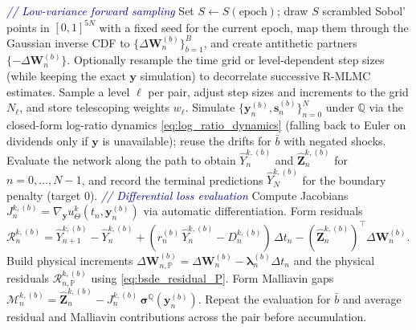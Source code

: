\documentclass[11pt,letterpaper,oneside]{article}
\numberwithin{equation}{section}
\newcommand{\1}{\mathbf{1}}
\begin{document}
\begin{algorithm}[H]
\begin{algorithmic}[1]
    \State \textcolor{darkblue}{\textit{// Low-variance forward sampling}}
    \State Set $S \leftarrow S(\mathrm{epoch})$; draw $S$ scrambled Sobol' points in $[0,1]^{5N}$ with a fixed seed for the current epoch, map them through the Gaussian inverse CDF to $\{\Delta\bm{W}_{n}^{(b)}\}_{b=1}^{B}$, and create antithetic partners $\{-\Delta\bm{W}_{n}^{(b)}\}$.
    \State Optionally resample the time grid or level-dependent step sizes (while keeping the exact $\bm{y}$ simulation) to decorrelate successive R-MLMC estimates.
      \State Sample a level $\ell$ per pair, adjust step sizes and increments to the grid $N_\ell$, and store telescoping weights $w_\ell$.
    \EndIf
      \State Simulate $\{\bm{y}_{n}^{(b)},\bm{s}_{n}^{(b)}\}_{n=0}^{N}$ under $\mathbb{Q}$ via the closed-form log-ratio dynamics \cref{eq:log_ratio_dynamics} (falling back to Euler on dividends only if $\bm{y}$ is unavailable); reuse the drifts for $\bar{b}$ with negated shocks.
      \State Evaluate the network along the path to obtain $\widehat{Y}_{n}^{k,(b)}$ and $\widehat{\bm{Z}}_{n}^{k,(b)}$ for $n=0,\dots,N-1$, and record the terminal predictions $\widehat{Y}_{N}^{k,(b)}$ for the boundary penalty (target $0$).
      \State \textcolor{darkblue}{\textit{// Differential loss evaluation}}
        \State Compute Jacobians $J_{n}^{k,(b)} = \nabla_{\bm{y}} u_{\Theta}^{k}(t_n,\bm{y}_{n}^{(b)})$ via automatic differentiation.
        \State Form residuals $\mathcal{R}_{n}^{k,(b)} = \widehat{Y}_{n+1}^{k,(b)} - \widehat{Y}_{n}^{k,(b)} + (r_{n}^{(b)}\,\widehat{Y}_{n}^{k,(b)} - D_{n}^{k,(b)})\,\Delta t_n - (\widehat{\bm{Z}}_{n}^{k,(b)})^{\top}\Delta\bm{W}_{n}^{(b)}$.
        \State Build physical increments $\Delta\bm{W}_{n,\mathbb{P}}^{(b)} = \Delta\bm{W}_{n}^{(b)} - \bm{\lambda}_{n}^{(b)}\Delta t_n$ and the physical residuals $\mathcal{R}_{n,\mathbb{P}}^{k,(b)}$ using \cref{eq:bsde_residual_P}.
        \State Form Malliavin gaps $\mathcal{M}_{n}^{k,(b)} = \widehat{\bm{Z}}_{n}^{k,(b)} - J_{n}^{k,(b)}\,\bm{\sigma}^{\mathbb{Q}}(\bm{y}_{n}^{(b)})$.
      \EndFor
      \State Repeat the evaluation for $\bar{b}$ and average residual and Malliavin contributions across the pair before accumulation.
    \EndFor


\end{algorithmic}
\end{algorithm}
\end{document}
